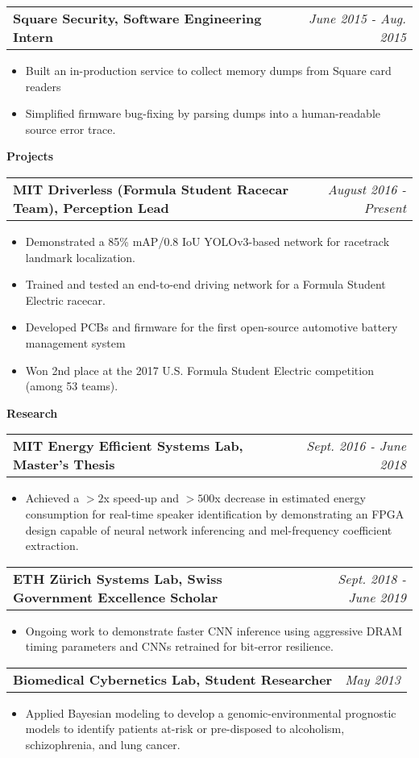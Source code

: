 \documentclass[letterpaper,11pt]{article}
\makeatletter
\newcommand{\resitem}[1]{\item[--] #1 \vspace{-4pt}}
\newcommand{\ressubheadingtwo}[2] {
\begin{tabular*}{7in}{l@{\extracolsep{\fill}}r}
	\textbf{#1} & \textit{#2} \\
\end{tabular*}\vspace{-6pt}}
\makeatother
\begin{document}
	\ressubheadingtwo{Square Security, Software Engineering Intern}{June 2015 - Aug. 2015}
	\begin{itemize}
            \itemsep0em
            \resitem{Built an in-production service to collect memory dumps from Square card readers}
            \resitem{Simplified firmware bug-fixing by parsing dumps into a human-readable source error trace.}
	\end{itemize}
    \vspace{0.05in}

\large \textbf{Projects\vspace{1mm}} \normalsize

    \ressubheadingtwo{MIT Driverless (Formula Student Racecar Team), Perception Lead}{August 2016 - Present}
    \begin{itemize}
        \itemsep0em
        \resitem{Demonstrated a 85\% mAP/0.8 IoU YOLOv3-based network for racetrack landmark localization.}
        \resitem{Trained and tested an end-to-end driving network for a Formula Student Electric racecar.}
        \resitem{Developed PCBs and firmware for the first open-source automotive battery management system}
        \resitem{Won 2nd place at the 2017 U.S. Formula Student Electric competition (among 53 teams).}
    \end{itemize}

\large \textbf{Research \vspace{1mm}} \normalsize
    \vspace{0.04in}

	\ressubheadingtwo{MIT Energy Efficient Systems Lab, Master's Thesis}{Sept. 2016 - June 2018}{}
	\begin{itemize}
            \itemsep0em
            \resitem{Achieved a $>2$x speed-up and $>500$x decrease in estimated energy consumption for real-time speaker identification by demonstrating an FPGA design capable of neural network inferencing and mel-frequency coefficient extraction.}
	\end{itemize}

    \ressubheadingtwo{ETH Z{\"u}rich Systems Lab, Swiss Government Excellence Scholar}{Sept. 2018 - June 2019}{}
	\begin{itemize}
            \itemsep0em
            \resitem{Ongoing work to demonstrate faster CNN inference using aggressive DRAM timing parameters and CNNs retrained for bit-error resilience.}
	\end{itemize}

    \ressubheadingtwo{Biomedical Cybernetics Lab, Student Researcher}{May 2013}{}
	\begin{itemize}
            \itemsep0em
            \resitem{Applied Bayesian modeling to develop a genomic-environmental prognostic models to identify patients at-risk or pre-disposed to alcoholism, schizophrenia, and lung cancer.}
	\end{itemize}
    \vspace{0.05in}
\end{document}
